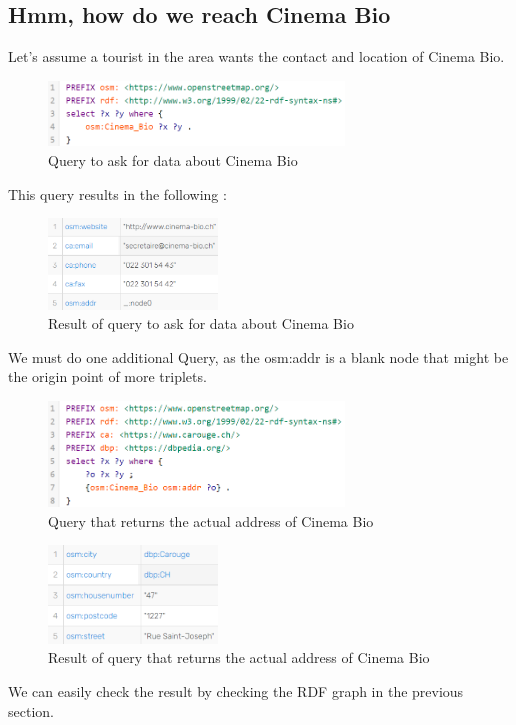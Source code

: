 \documentclass[a4paper]{article}
\begin{document}
\subsection*{Hmm, how do we reach Cinema Bio}
Let's assume a tourist in the area wants the contact and location of Cinema Bio.
\begin{figure}[H]
\center
\includegraphics*[width=0.7\textwidth]{images/cinema_query.PNG}
\caption{Query to ask for data about Cinema Bio}
\end{figure}
This query results in the following : 
\begin{figure}[H]
\center
\includegraphics*[width=0.4\textwidth]{images/cinema_query_res.PNG}
\caption{Result of query to ask for data about Cinema Bio}
\end{figure}
We must do one additional Query, as the osm:addr is a blank node that might be the origin point of more triplets.
\begin{figure}[H]
\center
\includegraphics*[width=0.7\textwidth]{images/cinema2_query.PNG}
\caption{Query that returns the actual address of Cinema Bio}
\end{figure}
\begin{figure}[H]
\center
\includegraphics*[width=0.4\textwidth]{images/cinema2_query_res.PNG}
\caption{Result of query that returns the actual address of Cinema Bio}
\end{figure}
We can easily check the result by checking the RDF graph in the previous section.
\end{document}
